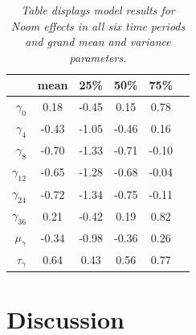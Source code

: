 \documentclass{article}
\begin{document}
\begin{table}[H]
\centering
\begin{tabular}{r c c c c c}
  \hline
 & mean & 25\% & 50\% & 75\%\\ 
  \hline
  $\gamma_0$ & 0.18 & -0.45 & 0.15 & 0.78  \\ 
  $\gamma_4$ & -0.43 & -1.05 & -0.46 & 0.16 \\ 
  $\gamma_8$ & -0.70 & -1.33 & -0.71 & -0.10 \\  
  $\gamma_{12}$ & -0.65 & -1.28 & -0.68 & -0.04 \\  
  $\gamma_{24}$ & -0.72 & -1.34 & -0.75 & -0.11 \\  
  $\gamma_{36}$ & 0.21 & -0.42 & 0.19 & 0.82 \\ 
  \hline \hline
  $\mu_{\gamma}$ & -0.34 & -0.98 & -0.36 & 0.26 \\ 
  $\tau_{\gamma}$ & 0.64 & 0.43 & 0.56 & 0.77 \\ 
   \hline
\end{tabular}
\caption{\emph{Table displays model results for Noom effects in all six time periods and grand mean and variance parameters.}}
\end{table}

\section{Discussion}
\end{document}

